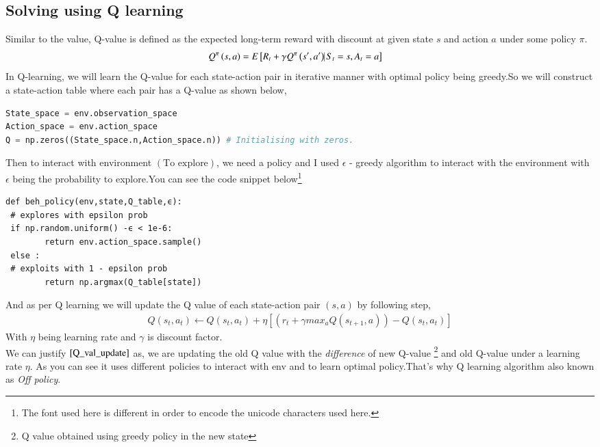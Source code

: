 \documentclass[journal,12pt,onecolumn]{IEEEtran}
\providecommand{\sbrak}[1]{\ensuremath{{}\left[#1\right]}}
\providecommand{\brak}[1]{\ensuremath{\left(#1\right)}}
\theoremstyle{remark}
\numberwithin{equation}{section}
\begin{document}
	\subsection{Solving using Q learning}
	  Similar to the value, Q-value is defined as the expected long-term reward with discount at given state $s$ and action $a$ under some policy $\pi$.
	  \begin{align}
		  Q^{\pi}\brak{s,a} &= E\sbrak{R_t + \gamma Q^{\pi}\brak{s',a'} \vline S_t = s , A_t = a}
	   \end{align}
	   In Q-learning, we will learn the Q-value for each state-action pair in iterative manner with optimal policy being greedy.So we will construct a state-action table where each pair has a Q-value as shown below,
       \begin{lstlisting}[language = Python]
State_space = env.observation_space
Action_space = env.action_space
Q = np.zeros((State_space.n,Action_space.n)) # Initialising with zeros.
           \end{lstlisting}
	   Then to interact with environment $\brak{\text{To explore}}$, we need a policy and I used $\epsilon$ - greedy algorithm to interact with the environment with $\epsilon$ being the probability to explore.You can see the code snippet below\footnote{The font used here is different in order to encode the unicode characters used here.}
	   \begin{verbatim}
def beh_policy(env,state,Q_table,ϵ):
 # explores with epsilon prob  
 if np.random.uniform() -ϵ < 1e-6:  
        return env.action_space.sample()
 else :
 # exploits with 1 - epsilon prob
        return np.argmax(Q_table[state])
	   \end{verbatim}
	   And as per Q learning we will update the Q value of each state-action pair $\brak{s,a}$ by following step, 
	     \begin{align}
		     Q\brak{s_t,a_t} \leftarrow Q\brak{s_t,a_t} + \eta\sbrak{\brak{r_t + \gamma max_{a}Q\brak{s_{t+1},a}} - Q\brak{s_t,a_t}}\label{Q_val_update}
	     \end{align}
                With $\eta$ being learning rate and $\gamma$ is discount factor. \\
		We can justify $\eqref{Q_val_update}$ as, we are updating the old Q value with the \emph{difference} of new Q-value \footnote{Q value obtained using greedy policy in the new state} and old Q-value under a learning rate $\eta$. As you can see it uses different policies to interact with env and to learn optimal policy.That's why Q learning algorithm also known as \textit{Off policy}. \\
\end{document}
